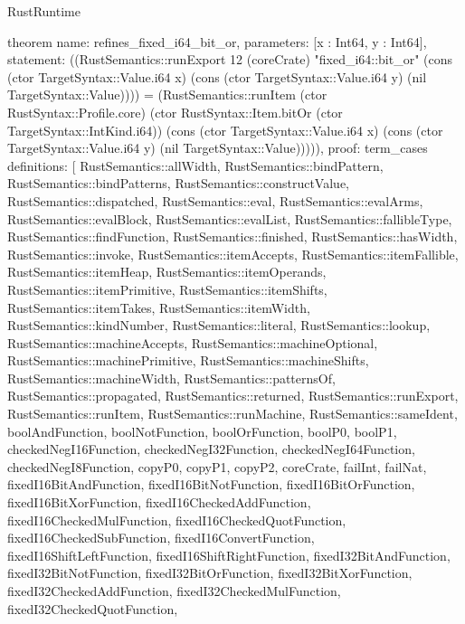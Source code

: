 \begin{lexlean}{RustRuntime}
\begin{semanticmodule}
theorem{
  name: refines_fixed_i64_bit_or,
  parameters: [x : Int64, y : Int64],
  statement: ((RustSemantics::runExport 12 (coreCrate) "fixed_i64::bit_or" (cons (ctor TargetSyntax::Value.i64 x) (cons (ctor TargetSyntax::Value.i64 y) (nil TargetSyntax::Value)))) = (RustSemantics::runItem (ctor RustSyntax::Profile.core) (ctor RustSyntax::Item.bitOr (ctor TargetSyntax::IntKind.i64)) (cons (ctor TargetSyntax::Value.i64 x) (cons (ctor TargetSyntax::Value.i64 y) (nil TargetSyntax::Value))))),
  proof: term_cases{
    definitions: [
      RustSemantics::allWidth,
      RustSemantics::bindPattern,
      RustSemantics::bindPatterns,
      RustSemantics::constructValue,
      RustSemantics::dispatched,
      RustSemantics::eval,
      RustSemantics::evalArms,
      RustSemantics::evalBlock,
      RustSemantics::evalList,
      RustSemantics::fallibleType,
      RustSemantics::findFunction,
      RustSemantics::finished,
      RustSemantics::hasWidth,
      RustSemantics::invoke,
      RustSemantics::itemAccepts,
      RustSemantics::itemFallible,
      RustSemantics::itemHeap,
      RustSemantics::itemOperands,
      RustSemantics::itemPrimitive,
      RustSemantics::itemShifts,
      RustSemantics::itemTakes,
      RustSemantics::itemWidth,
      RustSemantics::kindNumber,
      RustSemantics::literal,
      RustSemantics::lookup,
      RustSemantics::machineAccepts,
      RustSemantics::machineOptional,
      RustSemantics::machinePrimitive,
      RustSemantics::machineShifts,
      RustSemantics::machineWidth,
      RustSemantics::patternsOf,
      RustSemantics::propagated,
      RustSemantics::returned,
      RustSemantics::runExport,
      RustSemantics::runItem,
      RustSemantics::runMachine,
      RustSemantics::sameIdent,
      boolAndFunction,
      boolNotFunction,
      boolOrFunction,
      boolP0,
      boolP1,
      checkedNegI16Function,
      checkedNegI32Function,
      checkedNegI64Function,
      checkedNegI8Function,
      copyP0,
      copyP1,
      copyP2,
      coreCrate,
      failInt,
      failNat,
      fixedI16BitAndFunction,
      fixedI16BitNotFunction,
      fixedI16BitOrFunction,
      fixedI16BitXorFunction,
      fixedI16CheckedAddFunction,
      fixedI16CheckedMulFunction,
      fixedI16CheckedQuotFunction,
      fixedI16CheckedSubFunction,
      fixedI16ConvertFunction,
      fixedI16ShiftLeftFunction,
      fixedI16ShiftRightFunction,
      fixedI32BitAndFunction,
      fixedI32BitNotFunction,
      fixedI32BitOrFunction,
      fixedI32BitXorFunction,
      fixedI32CheckedAddFunction,
      fixedI32CheckedMulFunction,
      fixedI32CheckedQuotFunction,
}}
\end{semanticmodule}
\end{lexlean}
